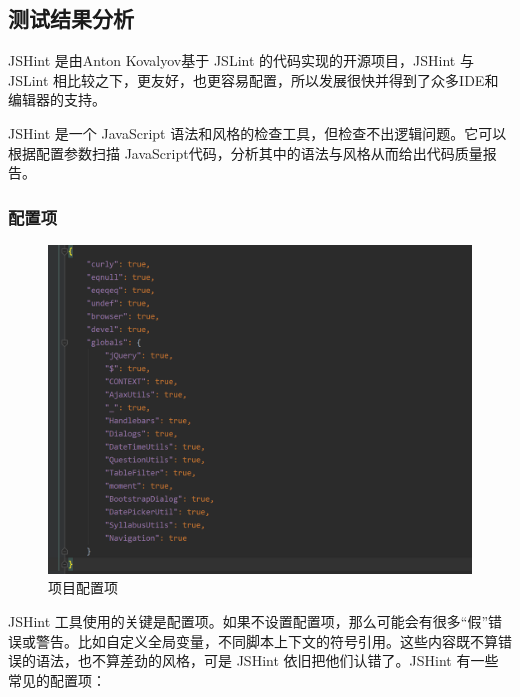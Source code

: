 \documentclass[hyperref, a4paper]{ctexart}
\begin{document}
\hypertarget{ux6d4bux8bd5ux7ed3ux679cux5206ux6790-2}{%
\subsection{测试结果分析}\label{ux6d4bux8bd5ux7ed3ux679cux5206ux6790-2}}

JSHint 是由Anton Kovalyov基于 JSLint 的代码实现的开源项目，JSHint 与
JSLint
相比较之下，更友好，也更容易配置，所以发展很快并得到了众多IDE和编辑器的支持。

JSHint 是一个 JavaScript
语法和风格的检查工具，但检查不出逻辑问题。它可以根据配置参数扫描
JavaScript代码，分析其中的语法与风格从而给出代码质量报告。

\hypertarget{ux914dux7f6eux9879}{%
\subsubsection{配置项}\label{ux914dux7f6eux9879}}

\begin{figure}
\centering
\includegraphics{screenshots/jshintrc.png}
\caption{项目配置项}
\end{figure}

JSHint
工具使用的关键是配置项。如果不设置配置项，那么可能会有很多``假''错误或警告。比如自定义全局变量，不同脚本上下文的符号引用。这些内容既不算错误的语法，也不算差劲的风格，可是
JSHint 依旧把他们认错了。JSHint 有一些常见的配置项：
\end{document}

